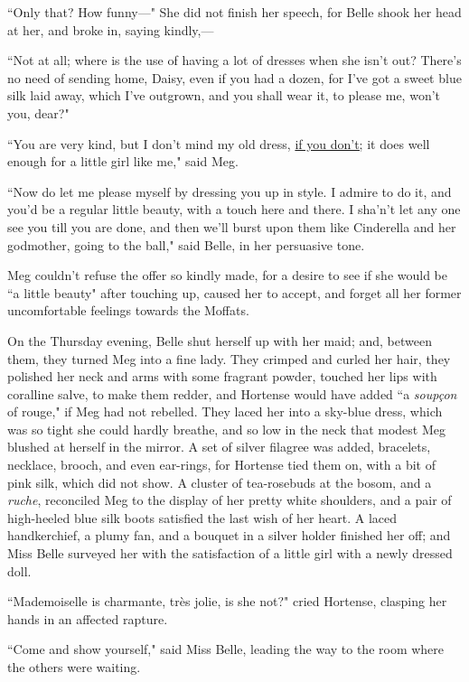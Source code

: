 ``Only that? How funny---" She did not finish her speech, for Belle shook
her head at her, and broke in, saying kindly,---

``Not at all; where is the use of having a lot of dresses when she
isn't out? There's no need of sending
home, Daisy, even if you had a dozen, for I've got a
sweet blue silk laid away, which I've outgrown, and you
shall wear it, to please me, won't you, dear?"

``You are very kind, but I don't mind my old dress,
\underline{if you don't;} it does well enough for a little girl
like me," said Meg.

``Now do let me please myself by dressing you up in style. I admire to do
it, and you'd be a regular little beauty, with a touch
here and there. I sha'n't let any one
see you till you are done, and then we'll burst upon
them like Cinderella and her godmother, going to the ball," said Belle,
in her persuasive tone.

Meg couldn't refuse the offer so kindly made, for a
desire to see if she would be ``a little beauty" after touching up,
caused her to accept, and forget all her former uncomfortable feelings
towards the Moffats.

On the Thursday evening, Belle shut herself up with her maid; and,
between them, they turned Meg into a fine lady. They crimped and curled
her hair, they polished her neck and arms with some fragrant powder,
touched her lips with coralline salve, to make them redder, and Hortense
would have added ``a \emph{soupçon} of rouge," if Meg had not rebelled.
They laced her into a sky-blue dress, which was so tight she could
hardly breathe, and so low in the neck that modest Meg blushed at
herself in the mirror. A set of silver filagree was added, bracelets,
necklace, brooch, and even ear-rings, for Hortense tied them on, with a
bit of pink silk, which did not show. A cluster of tea-rosebuds at the
bosom, and a \emph{ruche}, reconciled Meg to the display of her pretty
white shoulders, and a pair of high-heeled blue silk boots satisfied the
last wish of her heart. A laced handkerchief, a plumy fan, and a bouquet
in a silver holder finished her off; and Miss Belle surveyed her with
the satisfaction of a little girl with a newly dressed doll.

``Mademoiselle is charmante, très jolie, is she not?" cried Hortense,
clasping her hands in an affected rapture.

``Come and show yourself," said Miss Belle, leading the way to the room
where the others were waiting.

